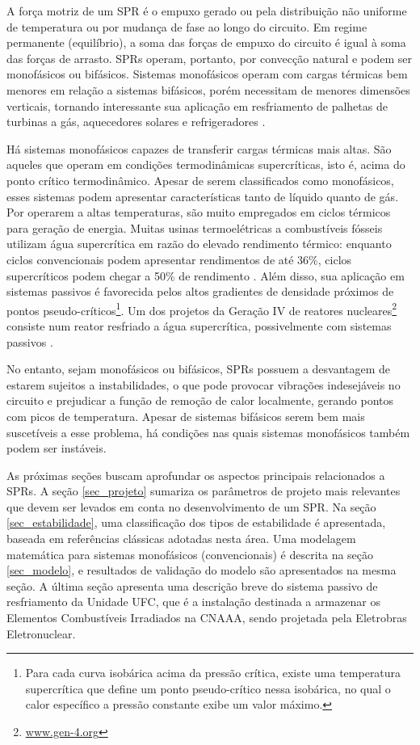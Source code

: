 \documentclass[a4paper,portuguese,10pt]{article}
\begin{document}
A força motriz de um SPR é o empuxo gerado ou pela distribuição não uniforme de temperatura ou por mudança de fase ao longo do circuito. Em regime permanente (equilíbrio), a soma das forças de empuxo do circuito é igual à soma das forças de arrasto. SPRs operam, portanto, por convecção natural e podem ser monofásicos ou bifásicos. Sistemas monofásicos operam com cargas térmicas bem menores em relação a sistemas bifásicos, porém necessitam de menores dimensões verticais, tornando interessante sua aplicação em resfriamento de palhetas de turbinas a gás, aquecedores solares e refrigeradores \cite{BASU13b}.

Há sistemas monofásicos capazes de transferir cargas térmicas mais altas. São aqueles que operam em condições termodinâmicas supercríticas, isto é, acima do ponto crítico termodinâmico. Apesar de serem classificados como monofásicos, esses sistemas podem apresentar características tanto de líquido quanto de gás. Por operarem a altas temperaturas, são muito empregados em ciclos térmicos para geração de energia. Muitas usinas termoelétricas a combustíveis fósseis utilizam água supercrítica em razão do elevado rendimento térmico: enquanto ciclos convencionais podem apresentar rendimentos de até 36\%, ciclos supercríticos podem chegar a 50\% de rendimento \cite{SCHULENBERG14}. Além disso, sua aplicação em sistemas passivos é favorecida pelos altos gradientes de densidade próximos de pontos pseudo-críticos\footnote{Para cada curva isobárica acima da pressão crítica, existe uma temperatura supercrítica que define um ponto pseudo-crítico nessa isobárica, no qual o calor específico a pressão constante exibe um valor máximo.}. Um dos projetos da Geração IV de reatores nucleares\footnote{\href{https://www.gen-4.org/gif/jcms/c_9260/public}{www.gen-4.org}} \cite{GOLDBERG11} consiste num reator resfriado a água supercrítica, possivelmente com sistemas passivos \cite{OKA95,BUONGIORNO03,SCHULENBERG11}.

No entanto, sejam monofásicos ou bifásicos, SPRs possuem a desvantagem de estarem sujeitos a instabilidades, o que pode provocar vibrações indesejáveis no circuito e prejudicar a função de remoção de calor localmente, gerando pontos com picos de temperatura. Apesar de sistemas bifásicos serem bem mais suscetíveis a esse problema, há condições nas quais sistemas monofásicos também podem ser instáveis.

As próximas seções buscam aprofundar os aspectos principais relacionados a SPRs. A seção \ref{sec_projeto} sumariza os parâmetros de projeto mais relevantes que devem ser levados em conta no desenvolvimento de um SPR. Na seção \ref{sec_estabilidade}, uma classificação dos tipos de estabilidade é apresentada, baseada em referências clássicas adotadas nesta área. Uma modelagem matemática para sistemas monofásicos (convencionais) é descrita na seção \ref{sec_modelo}, e resultados de validação do modelo são apresentados na mesma seção. A última seção apresenta uma descrição breve do sistema passivo de resfriamento da Unidade UFC, que é a instalação destinada a armazenar os Elementos Combustíveis Irradiados na CNAAA, sendo projetada pela Eletrobras Eletronuclear.
\end{document}
